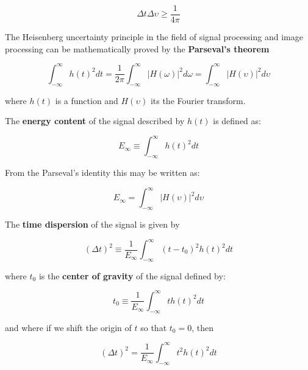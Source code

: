 \begin{equation}\label{eq:uncertainty_principle_freq}
	\Delta t\Delta \upsilon \geq \frac{1}{4\pi}
\end{equation}

The Heisenberg uncertainty principle in the field of signal processing and image processing can be mathematically proved by the \textbf{Parseval's theorem}

\begin{equation}\label{eq:parseval_theorem}
	\int_{-\infty}^{\infty} h(t)^2 dt =  \frac{1}{2 \pi} \int_{-\infty}^{\infty} |H(\omega)|^2 d\omega =  \int_{-\infty}^{\infty} |H(\upsilon)|^2 d\upsilon
\end{equation}

where $h(t)$ is a function and $H(\upsilon)$ its the Fourier transform. 

The \textbf{energy content} of the signal described by $h(t)$ is defined as:

\begin{equation}\label{eq:energy_content_time}
    E_{\infty} \equiv \int_{-\infty}^{\infty}  h(t)^2 dt
\end{equation}


From the Parseval's identity this may be written as:

\begin{equation}\label{eq:energy_content_frequency}
    E_{\infty} =  \int_{-\infty}^{\infty} |H(\upsilon)|^2 d\upsilon
\end{equation}

The \textbf{time dispersion} of the signal is given by

\begin{equation}\label{eq:time_dispersion_no_centered}
    (\Delta t)^2 \equiv \frac{1}{E_{\infty}} \int_{-\infty}^{\infty} (t-t_{0})^2 h(t)^2 dt
\end{equation}

where $t_0$ is the \textbf{center of gravity} of the signal defined by:

\begin{equation}\label{eq:center_of_gravity}
    t_0 \equiv \frac{1}{E_{\infty}} \int_{-\infty}^{\infty} t h(t)^2 dt
\end{equation}

and where if we shift the origin of $t$ so that $t_{0}=0$, then

\begin{equation}\label{eq:time_dispersion}
    (\Delta t)^2 = \frac{1}{E_{\infty}} \int_{-\infty}^{\infty} t^2 h(t)^2 dt
\end{equation}

